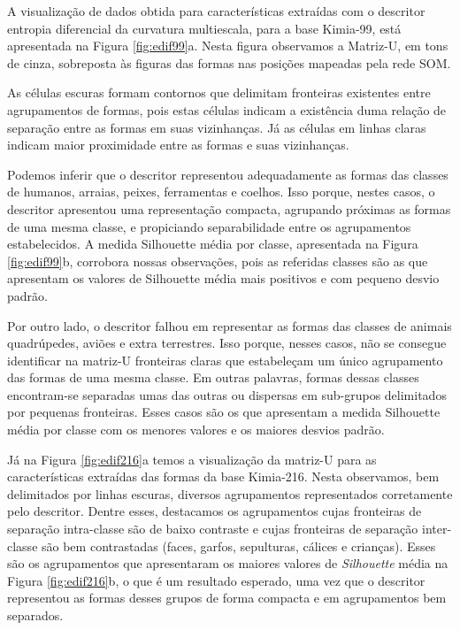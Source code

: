 A visualização de dados obtida para características extraídas com o descritor entropia diferencial da curvatura multiescala, para a base Kimia-99, está apresentada na Figura \ref{fig:edif99}a. Nesta figura observamos a Matriz-U, em tons de cinza, sobreposta às figuras das formas nas posições mapeadas pela rede SOM.

As células escuras formam contornos que delimitam fronteiras existentes entre agrupamentos de formas, pois estas células indicam a existência duma relação de separação entre as formas em suas vizinhanças. Já as células em linhas claras indicam maior proximidade entre as formas e suas vizinhanças.

Podemos inferir que o descritor representou adequadamente as formas das classes de humanos, arraias, peixes, ferramentas e coelhos. Isso porque, nestes casos, o descritor apresentou uma representação compacta, agrupando próximas as formas de uma mesma classe, e propiciando separabilidade entre os agrupamentos estabelecidos. A medida Silhouette média por classe, apresentada na Figura \ref{fig:edif99}b, corrobora nossas observações, pois as referidas classes são as que apresentam os valores de Silhouette média mais positivos e com pequeno desvio padrão.  

Por outro lado, o descritor falhou em representar as formas das classes de animais quadrúpedes, aviões e extra terrestres. Isso porque, nesses casos, não se consegue identificar na matriz-U fronteiras claras que estabeleçam um único agrupamento das formas de uma mesma classe. Em outras palavras, formas dessas classes encontram-se separadas umas das outras ou dispersas em sub-grupos delimitados por pequenas fronteiras. Esses casos são os que apresentam a medida Silhouette média por classe com os menores valores e os maiores desvios padrão. 

Já na Figura \ref{fig:edif216}a temos a visualização da matriz-U para as características extraídas das formas da base Kimia-216. Nesta observamos, bem delimitados por linhas escuras, diversos agrupamentos  representados corretamente pelo descritor. Dentre esses, destacamos os agrupamentos cujas fronteiras de separação intra-classe são de baixo contraste e cujas fronteiras de separação inter-classe são bem contrastadas (faces, garfos, sepulturas, cálices e crianças). Esses são os  agrupamentos que apresentaram os maiores valores de \emph{Silhouette} média na Figura \ref{fig:edif216}b, o que é um resultado esperado, uma vez que o descritor representou as formas desses grupos de forma compacta e em agrupamentos bem separados.




